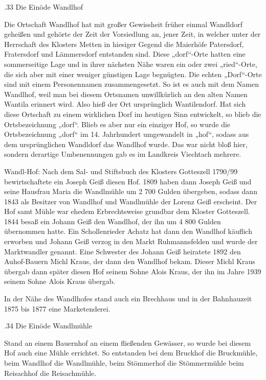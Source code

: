 \documentclass{book}
\begin{document}
.33 Die Einöde Wandlhof

Die Ortschaft Wandlhof hat mit großer Gewissheit früher einmal Wandldorf
geheißen und gehörte der Zeit der Vorsiedlung an, jener Zeit, in welcher unter
der Herrschaft des Klosters Metten in hiesiger Gegend die Maierhöfe Patersdorf,
Fratersdorf und Lämmersdorf entstanden sind. Diese „dorf“-Orte hatten eine
sommerseitige Lage und in ihrer nächsten Nähe waren ein oder zwei „ried“-Orte,
die sich aber mit einer weniger günstigen Lage begnügten. Die echten „Dorf“-Orte
sind mit einem Personennamen zusammengesetzt. So ist es auch mit dem Namen
Wandlhof, weil man bei diesem Ortsnamen unwillkürlich an den alten Namen Wantila
erinnert wird. Also hieß der Ort ursprünglich Wantilendorf. Hat sich diese
Ortschaft zu einem wirklichen Dorf im heutigen Sinn entwickelt, so blieb die
Ortsbezeichnung „dorf“. Blieb es aber nur ein einziger Hof, so wurde die
Ortsbezeichnung „dorf“ im 14. Jahrhundert umgewandelt in „hof“, sodass aus dem
ursprünglichen Wandldorf das Wandlhof wurde. Das war nicht bloß hier, sondern
derartige Umbenennungen gab es im Landkreis Viechtach mehrere.

Wandl-Hof: Nach dem Sal- und Stiftsbuch des Klosters Gotteszell 1790/99
bewirtschaftete ein Joseph Geiß diesen Hof. 1809 haben dann Joseph Geiß und
seine Hausfrau Maria die Wandlmühle um 2 700 Gulden übergeben, sodass dann 1843
als Besitzer von Wandlhof und Wandlmühle der Lorenz Geiß erscheint. Der Hof samt
Mühle war ehedem Erbrechtsweise grundbar dem Kloster Gotteszell. 1844 besaß ein
Johann Geiß den Wandlhof, der ihn um 4 800 Gulden übernommen hatte. Ein
Schollenrieder Achatz hat dann den Wandlhof käuflich erworben und Johann Geiß
verzog in den Markt Ruhmannsfelden und wurde der Marktwandler genannt. Eine
Schwester des Johann Geiß heiratete 1892 den Auhof-Bauern Michl Kraus, der dann
den Wandlhof bekam. Dieser Michl Kraus übergab dann später diesen Hof seinem
Sohne Alois Kraus, der ihn im Jahre 1939 seinem Sohne Alois Kraus übergab.

In der Nähe des Wandlhofes stand auch ein Brechhaus und in der Bahnhauzeit 1875
bis 1877 eine Marketenderei.

.34 Die Einöde Wandlmühle

Stand an einem Bauernhof an einem fließenden Gewässer, so wurde bei diesem Hof
auch eine Mühle errichtet. So entstanden bei dem Bruckhof die Bruckmühle, beim
Wandlhof die Wandlmühle, beim Stömmerhof die Stömmermühle beim Reisachhof die
Reisachmühle.
\end{document}
